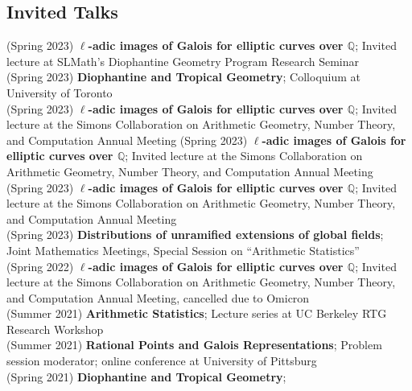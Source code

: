 \documentclass[margin,line]{res}
\begin{document}
\begin{resume}
  \section{\sc Invited Talks}
(Spring 2023) \textbf{$\ell$-adic images of Galois for elliptic curves over $\mathbb{Q}$};
Invited lecture at SLMath's Diophantine Geometry Program Research Seminar
\vspace{.05cm}\\  
(Spring 2023) \textbf{Diophantine and Tropical Geometry};
Colloquium at University of Toronto
\vspace{.05cm}\\  
(Spring 2023) \textbf{$\ell$-adic images of Galois for elliptic curves over $\mathbb{Q}$};
Invited lecture at  the Simons Collaboration on Arithmetic Geometry, Number Theory, and Computation Annual Meeting
(Spring 2023) \textbf{$\ell$-adic images of Galois for elliptic curves over $\mathbb{Q}$};
Invited lecture at  the Simons Collaboration on Arithmetic Geometry, Number Theory, and Computation Annual Meeting
(Spring 2023) \textbf{$\ell$-adic images of Galois for elliptic curves over $\mathbb{Q}$};
Invited lecture at  the Simons Collaboration on Arithmetic Geometry, Number Theory, and Computation Annual Meeting
\vspace{.05cm}\\
(Spring 2023) \textbf{Distributions of unramified extensions of global fields};
Joint Mathematics Meetings, Special Session on ``Arithmetic Statistics''
\vspace{.05cm}\\
(Spring 2022) \textbf{$\ell$-adic images of Galois for elliptic curves over $\mathbb{Q}$};
Invited lecture at  the Simons Collaboration on Arithmetic Geometry, Number Theory, and Computation Annual Meeting, cancelled due to Omicron
\vspace{.05cm}\\
(Summer 2021) \textbf{Arithmetic Statistics};
Lecture series at UC Berkeley RTG Research Workshop
\vspace{.05cm}\\
(Summer 2021) \textbf{Rational Points and Galois Representations};
Problem session moderator; online conference at University of Pittsburg
\vspace{.05cm}\\
(Spring 2021) \textbf{Diophantine and Tropical Geometry};

\end{resume}
\end{document}
